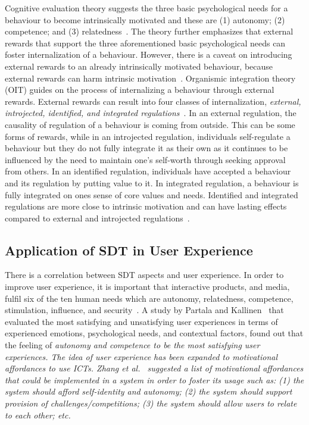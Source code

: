\documentclass{sig-alternate}
\begin{document}
Cognitive evaluation theory suggests the three basic psychological needs for a behaviour to become intrinsically motivated and these are (1) autonomy; (2) competence; and (3) relatedness~\cite{deci1985:intrinsic}. 
The theory further emphasizes that external rewards that support the three aforementioned basic psychological needs can foster internalization of a behaviour. However, there is a caveat on introducing external rewards to an already intrinsically motivated behaviour, because external rewards can harm intrinsic motivation~\cite{ryan2000:self}. Organismic integration theory (OIT) guides on the process of internalizing a behaviour through external rewards. External rewards can result into four classes of internalization, \emph{external, introjected, identified, and integrated regulations}~\cite{ryan2000:self}. In an external regulation, the causality of regulation of a behaviour is coming from outside. This can be some forms of rewards, while in an introjected regulation, individuals self-regulate a behaviour but they do not fully integrate it as their own as it continues to be influenced by the need to maintain one's self-worth through seeking approval from others. In an identified  regulation, individuals have accepted a behaviour and its regulation by putting value to it. In integrated regulation, a behaviour is fully integrated on ones sense of core values and needs. Identified and integrated regulations are more close to intrinsic motivation and can have lasting effects compared to external and introjected regulations~\cite{ryan2000intrinsic}. 

\subsection{Application of SDT in User Experience}
There is a correlation between SDT aspects and user experience. In order to improve user experience, it is important that interactive products, and media, fulfil six of the ten human needs which are autonomy, relatedness, competence, stimulation, influence, and security~\cite{wiklund2009:needs}. A study by Partala and Kallinen~\cite{partala2012:understanding} that evaluated the most satisfying and unsatisfying user experiences in terms of experienced emotions, psychological needs, and contextual factors, found out that the feeling of \em{autonomy} and \em{competence} to be the most satisfying user experiences. The idea of user experience has been expanded to motivational affordances to use ICTs. Zhang et al.~\cite{zhang2008:motivational} suggested a list of motivational affordances that could be implemented in a system in order to foster its usage such as: (1) the system should afford self-identity and autonomy; (2) the system should support provision of challenges/competitions; (3) the system should allow users to relate to each other; etc.
\end{document}

